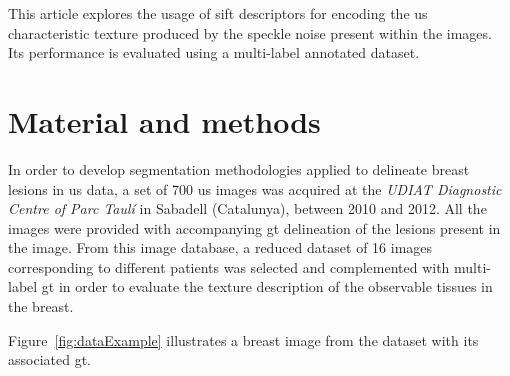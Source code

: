 \documentclass[a4paper, 10pt, conference]{llncs}      %
\begin{document}

This article explores the usage of \ac{sift} descriptors for encoding the \ac{us} characteristic texture produced by the speckle noise present within the images. Its performance is evaluated using a multi-label annotated dataset.  

\section{Material and methods}
In order to develop segmentation methodologies applied to delineate breast lesions in \ac{us} data, a set of 700 \ac{us} images was acquired at the \emph{UDIAT Diagnostic Centre of Parc Taul\'{i}} in Sabadell (Catalunya), between 2010 and 2012. All the images were provided with accompanying \ac{gt} delineation of the lesions present in the image. From this image database, a reduced dataset of 16 images corresponding to different patients was selected and complemented with multi-label \ac{gt} in order to evaluate the texture description of the observable tissues in the breast.

Figure~\ref{fig:dataExample} illustrates a breast image from the dataset with its associated \ac{gt}. 


\end{document}
